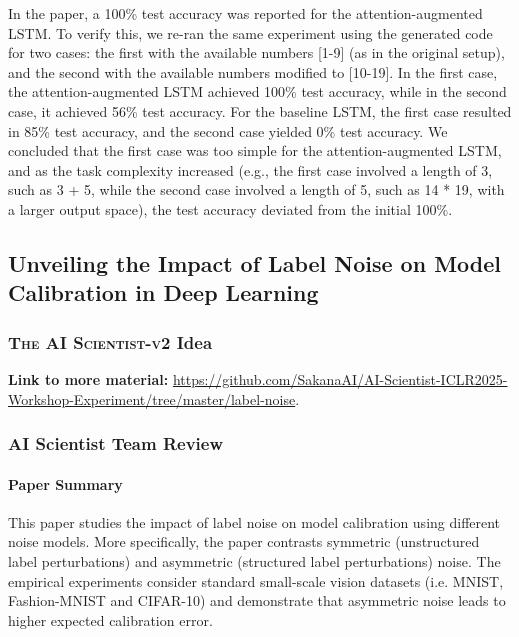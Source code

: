 \documentclass[11pt, a4paper]{include/gdm_format}
\newcommand{\ouralgo}{\textsc{The AI Scientist-v2}\xspace}
\begin{document}
In the paper, a 100\% test accuracy was reported for the attention-augmented LSTM. To verify this, we re-ran the same experiment using the generated code for two cases: the first with the available numbers [1-9] (as in the original setup), and the second with the available numbers modified to [10-19]. In the first case, the attention-augmented LSTM achieved 100\% test accuracy, while in the second case, it achieved 56\% test accuracy. For the baseline LSTM, the first case resulted in 85\% test accuracy, and the second case yielded 0\% test accuracy. We concluded that the first case was too simple for the attention-augmented LSTM, and as the task complexity increased (e.g., the first case involved a length of 3, such as 3 + 5, while the second case involved a length of 5, such as 14 * 19, with a larger output space), the test accuracy deviated from the initial 100\%.


\clearpage

\subsection{Unveiling the Impact of Label Noise on Model Calibration in Deep Learning}

\subsubsection{\ouralgo Idea}
\begin{tcolorbox}[colback=blue!5!white, colframe=blue!75!black, title=Idea]
{\scriptsize  }
\end{tcolorbox}

\textbf{Link to more material:} \url{https://github.com/SakanaAI/AI-Scientist-ICLR2025-Workshop-Experiment/tree/master/label-noise}.


\label{paper:label_noise}

%
\subsubsection{AI Scientist Team Review}

\paragraph{Paper Summary}
This paper studies the impact of label noise on model calibration using different noise models. More specifically, the paper contrasts symmetric (unstructured label perturbations) and asymmetric (structured label perturbations) noise. The empirical experiments consider standard small-scale vision datasets (i.e. MNIST, Fashion-MNIST and CIFAR-10) and demonstrate that asymmetric noise leads to higher expected calibration error.
\end{document}
